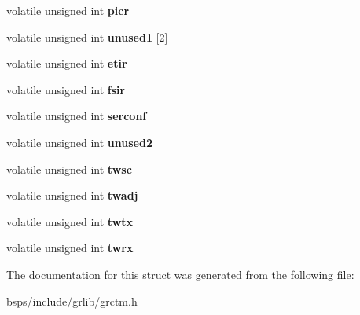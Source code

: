 \begin{DoxyCompactItemize}
volatile unsigned int {\bfseries picr}
\item 
\mbox{\label{structgrctm__regs_a0a23045ca881ad961240b13d72ce324b}} 
volatile unsigned int {\bfseries unused1} \mbox{[}2\mbox{]}
\item 
\mbox{\label{structgrctm__regs_a4b51e711174225fda287a0aec2afe39f}} 
volatile unsigned int {\bfseries etir}
\item 
\mbox{\label{structgrctm__regs_ad3506ac249c9b34e9683e2fff2835c5b}} 
volatile unsigned int {\bfseries fsir}
\item 
\mbox{\label{structgrctm__regs_ace68770c0afc5c5c132d4879300b931f}} 
volatile unsigned int {\bfseries serconf}
\item 
\mbox{\label{structgrctm__regs_ac65cf24a6738918461a9aa0ce4e8493c}} 
volatile unsigned int {\bfseries unused2}
\item 
\mbox{\label{structgrctm__regs_ac52286207978f8d259407b2fc9910210}} 
volatile unsigned int {\bfseries twsc}
\item 
\mbox{\label{structgrctm__regs_a5a12517039f79d43b2b9e5c915d5b035}} 
volatile unsigned int {\bfseries twadj}
\item 
\mbox{\label{structgrctm__regs_ad02db13887dc3d92e3c4272123220f18}} 
volatile unsigned int {\bfseries twtx}
\item 
\mbox{\label{structgrctm__regs_a73fe096a335de2369d443b68bb87d372}} 
volatile unsigned int {\bfseries twrx}
\end{DoxyCompactItemize}


The documentation for this struct was generated from the following file\+:\begin{DoxyCompactItemize}
\item 
bsps/include/grlib/grctm.\+h\end{DoxyCompactItemize}
